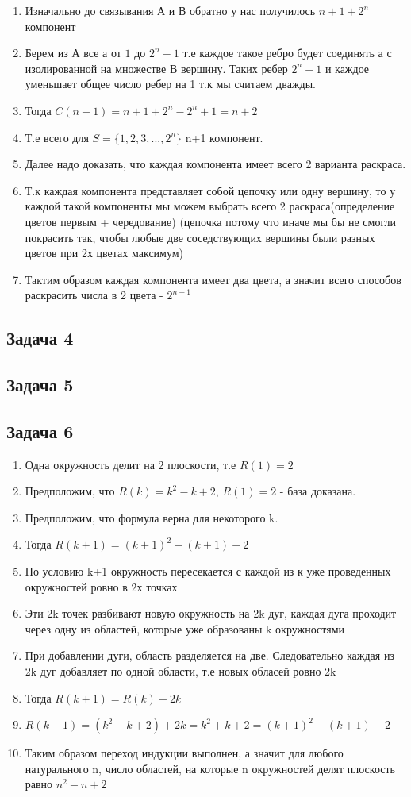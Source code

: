 \documentclass[a4paper,12pt]{article}
\begin{document}
\begin{enumerate}
    \item Изначально до связывания А и В обратно у нас получилось $n+1+2^n$ компонент
    \item Берем из А все а от $1$ до $2^n-1$ т.е каждое такое ребро будет соединять а с изолированной на множестве В вершину. Таких ребер $2^n-1$ и каждое уменьшает общее число ребер на 1 т.к мы считаем дважды.
    \item Тогда $C(n+1) = n+1+2^n-2^n+1=n+2$
    \item Т.е всего для $S = \{1, 2, 3 ,..., 2^n\}$ n+1 компонент.
    \item Далее надо доказать, что каждая компонента имеет всего 2 варианта раскраса.
    \item Т.к каждая компонента представляет собой цепочку или одну вершину, то у каждой такой компоненты мы можем выбрать всего 2 раскраса(определение цветов первым + чередование) (цепочка потому что иначе мы бы не смогли покрасить так, чтобы любые две соседствующих вершины были разных цветов при 2х цветах максимум)
    \item Тактим образом каждая компонента имеет два цвета, а значит всего способов раскрасить числа в 2 цвета - $2^{n+1}$
\end{enumerate}

\subsection{Задача 4}

\subsection{Задача 5}

\subsection{Задача 6}
\begin{enumerate}
    \item Одна окружность делит на 2 плоскости, т.е $R(1)=2$
    \item Предположим, что $R(k)=k^2-k+2$, $R(1) = 2$ - база доказана.
    \item Предположим, что формула верна для некоторого k.
    \item Тогда $R(k+1)=(k+1)^2-(k+1)+2$
    \item По условию k+1 окружность пересекается с каждой из к уже проведенных окружностей ровно в 2х точках
    \item Эти 2k точек разбивают новую окружность на 2k дуг, каждая дуга проходит через одну из областей, которые уже образованы k окружностями
    \item При добавлении дуги, область разделяется на две. Следовательно каждая из 2k дуг добавляет по одной области, т.е новых обласей ровно 2k
    \item Тогда $R(k+1)=R(k)+2k$
    \item $R(k+1)=(k^2-k+2)+2k=k^2+k+2=(k+1)^2-(k+1)+2$
    \item Таким образом переход индукции выполнен, а значит для любого натурального n, число областей, на которые n окружностей делят плоскость равно $n^2-n+2$
\end{enumerate}
\end{document}
